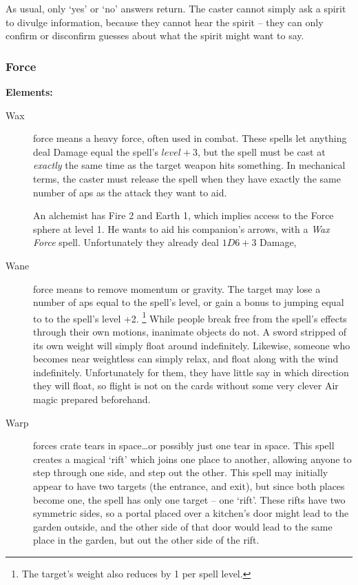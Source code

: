 \begin{multicols}{2}
\begin{description}
\begin{description}
        As usual, only `yes' or `no' answers return.
        The caster cannot simply ask a spirit to divulge information, because they cannot hear the spirit -- they can only confirm or disconfirm guesses about what the spirit might want to say.
    \end{description}
\end{description}

\subsubsection{Force}

\textbf{Elements:}

\begin{description}
  \item[Wax]
  force means a heavy force, often used in combat.
  These spells let anything deal Damage equal the spell's $level + 3$, but the spell must be cast at \emph{exactly} the same time as the target weapon hits something.
  In mechanical terms, the caster must release the spell when they have exactly the same number of \glspl{ap} as the attack they want to aid.

  \begin{exampletext}
    An alchemist has Fire 2 and Earth 1, which implies access to the Force sphere at level 1.
    He wants to aid his companion's arrows, with a \textit{Wax Force} spell.
    Unfortunately they already deal $1D6+3$ Damage, 
  \end{exampletext}
  \item[Wane]
  force means to remove momentum or gravity.
  The target may lose a number of \glspl{ap} equal to the spell's level, or gain a bonus to jumping equal to to the spell's level +2.%
  \footnote{The target's \gls{weight} also reduces by 1 per spell level.}
  While people break free from the spell's effects through their own motions, inanimate objects do not.
  A sword stripped of its own weight will simply float around indefinitely.
  Likewise, someone who becomes near weightless can simply relax, and float along with the wind indefinitely.
  Unfortunately for them, they have little say in which direction they will float, so flight is not on the cards without some very clever Air magic prepared beforehand.
  \item[Warp]
  forces crate tears in space\ldots or possibly just one tear in space.
  This spell creates a magical `rift' which joins one place to another, allowing anyone to step through one side, and step out the other.
  This spell may initially appear to have two targets (the entrance, and exit), but since both places become one, the spell has only one target -- one `rift'.
  These rifts have two symmetric sides, so a portal placed over a kitchen's door might lead to the garden outside, and the other side of that door would lead to the same place in the garden, but out the other side of the rift.


\end{description}
\end{multicols}
